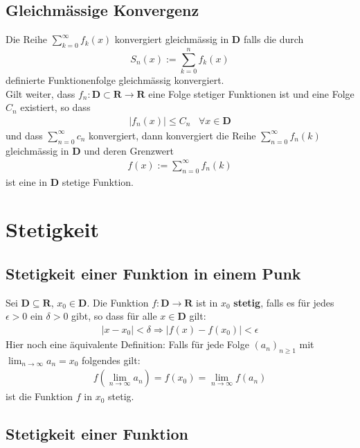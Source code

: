 \documentclass[8pt]{article}
\begin{document}
\begin{multicols*}{3}
\subsection{Gleichmässige Konvergenz}

Die Reihe $\sum_{k=0}^\infty f_k(x)$ konvergiert gleichmässig in $\mathbf{D}$ falls die durch
$$
  S_n(x) := \sum_{k=0}^n f_k(x)
$$
definierte Funktionenfolge gleichmässig konvergiert.\\
Gilt weiter, dass $f_n: \mathbf{D} \subset \mathbf{R} \rightarrow \mathbf{R}$ eine Folge
stetiger Funktionen ist und eine Folge $C_n$ existiert, so dass
\begin{align*}
  |f_n(x)| \leq C_n \;\;\; \forall x \in \mathbf{D}
\end{align*}
und dass $\sum_{n = 0}^\infty c_n$ konvergiert, dann konvergiert die Reihe
$\sum_{n = 0}^\infty f_n(k)$ gleichmässig in $\mathbf{D}$ und deren Grenzwert
\begin{align*}
  f(x) := \sum_{n = 0}^\infty f_n(k)
\end{align*}
ist eine in $\mathbf{D}$ stetige Funktion.
\section{Stetigkeit}
\hypertarget{sec:2}{}

\subsection{Stetigkeit einer Funktion in einem Punk}

Sei $\mathbf{D} \subseteq \mathbf{R}$, $x_0 \in \mathbf{D}$. Die Funktion
$f: \mathbf{D} \rightarrow \mathbf{R}$ ist in $x_0$ \textbf{stetig}, falls
es für jedes $\epsilon > 0$ ein $\delta > 0$ gibt, so dass für alle $x \in \mathbf{D}$
gilt:
\begin{align*}
  |x - x_0| < \delta \Rightarrow |f(x) - f(x_0)| < \epsilon 
\end{align*}
Hier noch eine äquivalente Definition: Falls für jede Folge $(a_n)_{n \geq 1}$ mit
$\lim_{n \rightarrow \infty} a_n = x_0$ folgendes gilt:
\begin{align*}
  f(\lim_{n \rightarrow \infty} a_n) = f(x_0) = \lim_{n \rightarrow \infty} f(a_n)
\end{align*}
ist die Funktion $f$ in $x_0$ stetig.

\subsection{Stetigkeit einer Funktion}


\end{multicols*}
\end{document}
